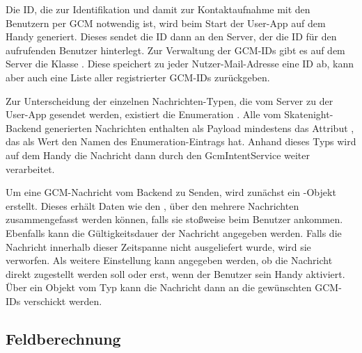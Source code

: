 Die ID, die zur Identifikation und damit zur Kontaktaufnahme mit den Benutzern per GCM notwendig ist, wird beim Start der User-App auf dem Handy generiert. Dieses sendet die ID dann an den Server, der die ID für den aufrufenden Benutzer hinterlegt. Zur Verwaltung der GCM-IDs gibt es auf dem Server die Klasse . Diese speichert zu jeder Nutzer-Mail-Adresse eine ID ab, kann aber auch eine Liste aller registrierter GCM-IDs zurückgeben.

Zur Unterscheidung der einzelnen Nachrichten-Typen, die vom Server zu der User-App gesendet werden, existiert die Enumeration . Alle vom Skatenight-Backend generierten Nachrichten enthalten als Payload mindestens das Attribut , das als Wert den Namen des Enumeration-Eintrags hat. Anhand dieses Typs wird auf dem Handy die Nachricht dann durch den GcmIntentService weiter verarbeitet.

Um eine GCM-Nachricht vom Backend zu Senden, wird zunächst ein -Objekt erstellt. Dieses erhält Daten wie den , über den mehrere Nachrichten zusammengefasst werden können, falls sie stoßweise beim Benutzer ankommen. Ebenfalls kann die Gültigkeitsdauer der Nachricht angegeben werden. Falls die Nachricht innerhalb dieser Zeitspanne nicht ausgeliefert wurde, wird sie verworfen. Als weitere Einstellung kann angegeben werden, ob die Nachricht direkt zugestellt werden soll oder erst, wenn der Benutzer sein Handy aktiviert. Über ein Objekt vom Typ  kann die Nachricht dann an die gewünschten GCM-IDs verschickt werden.

\subsection{Feldberechnung}
\label{subsec:Feldberechnung}

